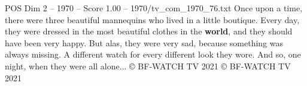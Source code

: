 \begin{textsample}{POS Dim 2 – 1970 – Score 1.00 – 1970/tv\_com\_1970\_76.txt}  \label{ex:f2_pos_056}
Once upon a time, there were three beautiful mannequins who lived in a little boutique.
Every day, they were dressed in the most beautiful clothes in the \textbf{world}, and they should have been very happy.
But alas, they were very sad, because something was always missing.
A different watch for every different look they wore.
And so, one night, when they were all alone... {\EmojiFont ©} BF-WATCH TV 2021 {\EmojiFont ©} BF-WATCH TV 2021

\end{textsample}
